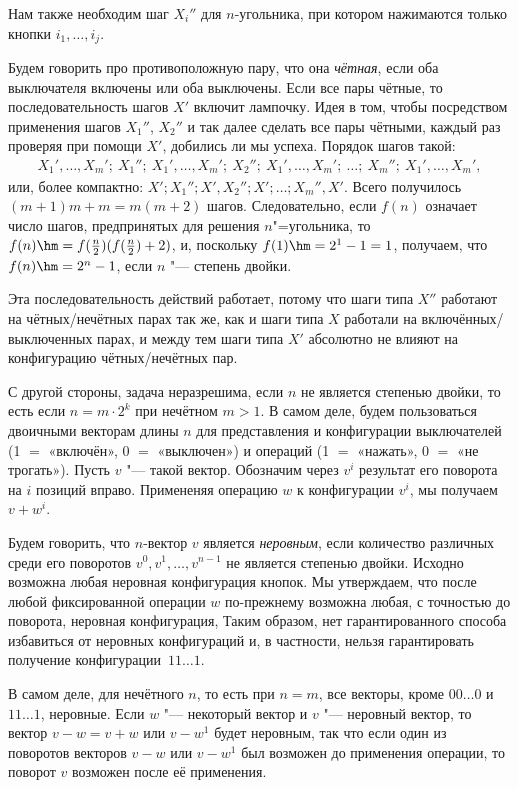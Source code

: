 \documentclass[twoside]{book}
\begin{document}
Нам также необходим шаг $X_i''$ для $n$-угольника, при котором нажимаются только кнопки $i_1,\dots,i_j$.

Будем говорить про противоположную пару, что она \emph{чётная}, если оба выключателя включены или оба выключены.
Если все пары чётные, то последовательность шагов $X'$ включит лампочку.
Идея в том, чтобы посредством применения шагов $X_1''$, $X_2''$ и так далее сделать все пары чётными, каждый раз проверяя при помощи $X'$, добились ли мы успеха.
Порядок шагов такой:
{\small
\begin{gather*}
X_1',\dots,X_m';\ X_1'';\ X_1',\dots,X_m';\ X_2'';\
X_1',\dots,X_m';\ \dots ;\ X_m'';\ X_1',\dots,X_m',
\end{gather*}
}
или, более компактно: $X';X_1'';X',X_2'';X';\dots;X_m'',X'$.
Всего получилось $(m+1)m+m=m(m+2)$ шагов.
Следовательно, если $f(n)$ означает число шагов, предпринятых для решения $n$"=угольника, то 
$f(n)\hm=f(\tfrac n2)(f(\tfrac n2)+2)$,
и, поскольку $f(1)\hm=2^1-1=1$, получаем, что $f(n)\hm=2^n-1$, если $n$ "--- степень двойки. %

Эта последовательность действий работает, потому что шаги типа $X''$ работают на чётных/нечётных парах так же, как и шаги типа $X$ работали на включённых/выключенных парах, и между тем шаги типа $X'$ абсолютно не влияют на конфигурацию чётных/нечётных пар.
\heart

С другой стороны, задача неразрешима, если $n$ не является степенью двойки, то есть если $n=m\cdot 2^k$ при нечётном $m>1$.
В самом деле, будем пользоваться двоичными векторам длины $n$ для представления и конфигурации выключателей (1 $=$ «включён», 0 $=$ «выключен») и операций (1 $=$ «нажать», 0 $=$ «не трогать»).
Пусть $v$ "--- такой вектор.
Обозначим через $v^i$ результат его поворота на $i$ позиций вправо.
Примененяя операцию $w$ к конфигурации $v^i$, мы получаем $v+w^i$.

Будем говорить, что $n$-вектор $v$ является \emph{неровным}, %
если количество различных среди его поворотов $v^0,v^1,\dots,v^{n-1}$ не является степенью двойки.
Исходно возможна любая неровная конфигурация кнопок.
Мы утверждаем, что после любой фиксированной операции $w$ по-прежнему
возможна любая, с точностью до поворота, неровная конфигурация,
Таким образом, нет гарантированного способа избавиться от неровных конфигураций и, в частности, нельзя гарантировать получение конфигурации~$11\dots1$.

В самом деле, для нечётного $n$, то есть при $n=m$, все векторы, кроме $00\dots0$ и $11\dots1$, неровные.
Если $w$ "--- некоторый вектор и $v$ "--- неровный вектор, то вектор $v-w=v+w$ или $v-w^1$ будет неровным, так что если один из поворотов векторов $v-w$ или $v-w^1$ был возможен до применения операции, то поворот $v$ возможен после её применения.
\end{document}
